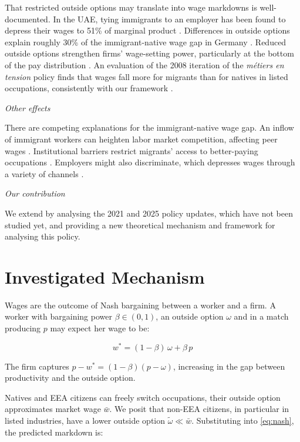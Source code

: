 \documentclass[10pt, a4paper]{article}
\begin{document}
\noindent That restricted outside options may translate into wage markdowns is
well-documented. In the UAE, tying immigrants to an employer has been found to depress their wages to 51\% of marginal product \citep{Naidu2016}. Differences in outside options explain roughly 30\% of the immigrant-native wage gap in Germany \citep{Caldwell2023}. Reduced outside options strengthen firms' wage-setting power, particularly at the bottom of the pay distribution \citep{Amior2024}. An evaluation of the 2008 iteration of the \textit{métiers en tension} policy finds that wages fall more for migrants than for natives in listed occupations, consistently with our framework \citep{Signorelli2024}.
\medskip

\noindent \textit{Other effects}

\noindent There are competing explanations for the immigrant-native wage gap. An inflow of immigrant workers can heighten labor market competition, affecting peer wages \citep{Albert2022}. Institutional barriers restrict migrants' access to better-paying occupations \citep{Brucker2018}. Employers might also discriminate, which depresses wages through a variety of channels \citep{Becker57,Glover2017}.
\medskip

\noindent \textit{Our contribution}

\noindent We extend \citet{Signorelli2024} by analysing the 2021 and 2025 policy updates, which have not been studied yet, and providing a new theoretical mechanism and framework for analysing this policy.
\medskip

\section{Investigated Mechanism}
\medskip

\noindent Wages are the outcome of Nash bargaining between a worker and a firm. A worker with bargaining power $\beta \in (0,1)$, an outside option $\omega$ and in a match producing $p$ may expect her wage to be:

\begin{equation}
  w^* = (1-\beta)\,\omega + \beta\, p
  \label{eq:nash}
\end{equation}

\noindent The firm captures $p - w^* = (1-\beta)(p - \omega)$, increasing in the gap between productivity and the outside option. 

\noindent Natives and EEA citizens can freely switch occupations, their outside option approximates market wage $\bar w$. We posit that non-EEA citizens, in particular in listed industries, have a lower outside option $\tilde\omega \ll \bar w$. Substituting into \eqref{eq:nash}, the predicted markdown is:
\end{document}
